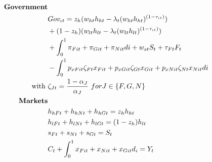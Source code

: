 \begin{align}
\text{\textbf{Government}}&\nonumber\\
&Gov_{\iota t}=z_h(w_{ht}h_{ht}-\lambda_t(w_{ht}h_{ht})^{(1-\tau_{\iota t})})\nonumber\\&+(1-z_h)(w_{lt}h_{lt}-\lambda_t(w_{lt}h_{lt})^{(1-\tau_{\iota t})})\nonumber\\&
+\int_{0}^{1}\pi_{Fit}+\pi_{Git}+\pi_{Nit}di+ w_{st}S_t+\tau_{Ft}F_t\nonumber\\ &-\int_{0}^{1} p_{xFit}\zeta_{Ft}x_{Fit}+p_{xGit}\zeta_{Gt}x_{Git}+ p_{xNit}\zeta_{Nt}x_{Nit}di\nonumber\\
\text{with}\ \vspace{4mm}&\zeta_{Jt}=\frac{1-\alpha_J}{\alpha_J}\ for J\in\{F,G,N\}\nonumber \\
\text{\textbf{Markets}}&\nonumber\\
&h_{hFt}+h_{hNt}+h_{hGt}=z_{h} h_{ht}\nonumber\\
&h_{lFt}+h_{lNt}+h_{lGt}=(1-z_h) h_{lt}\nonumber\\
&s_{Ft}+s_{Nt}+s_{Gt}=S_{t}\nonumber\\
&C_{t}+\int_{0}^{1} x_{Fit}+x_{Nit}+x_{Git}d_i=Y_t\nonumber
\end{align}

